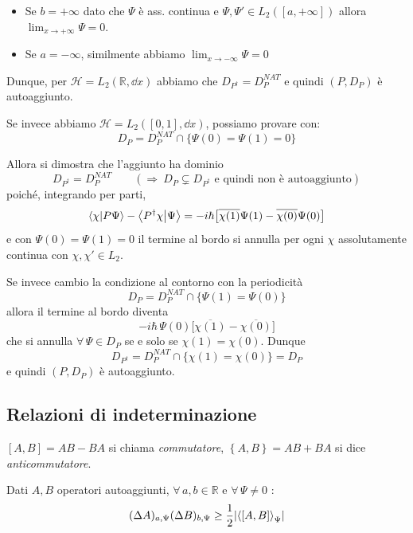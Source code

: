 \begin{itemize}
    \item Se \(b = +\infty\) dato che \(\Psi\) è ass. continua e \(\Psi, \Psi' \in L_2([a, +\infty])\) allora \(\lim_{x\to +\infty} \Psi= 0\).
    \item Se \(a = -\infty\), similmente abbiamo \(\lim_{x \to - \infty} \Psi=0\)
\end{itemize}
Dunque, per \(\mathcal{H}= L_2(\mathbb{R}, \dd{x})\) abbiamo che \(D_{P^\dagger}= D_{P}^{NAT}\) e quindi \((P, D_P)\) è autoaggiunto.

Se invece abbiamo \(\mathcal{H} = L_2([0,1], \dd{x})\), possiamo provare con:
\[
    D_P = D_P^{NAT} \cap \big\{ \Psi(0)=\Psi(1)=0 \big\}
\]

Allora si dimostra che l'aggiunto ha dominio
\[
    D_{P^\dagger}= D_P^{NAT} \qquad (\Rightarrow \ D_P \subsetneq D_{P^\dagger} \text{ e quindi non è autoaggiunto})
\]
poiché, integrando per parti,
\[
    \braket{\chi}{P\Psi}-\braket{P^\dagger\chi}{\Psi}
    = -i\hbar\big[\overline{\chi(1)}\Psi(1)-\overline{\chi(0)}\Psi(0)\big]
\]
e con \(\Psi(0)=\Psi(1)=0\) il termine al bordo si annulla per ogni \(\chi\) assolutamente continua con \(\chi,\chi'\in L_2\).

Se invece cambio la condizione al contorno con la periodicità
\[
    D_P = D_P^{NAT} \cap \big\{ \Psi(1)=\Psi(0) \big\}
\]
allora il termine al bordo diventa
\[
    -i\hbar\,\Psi(0)\big[\overline{\chi(1)}-\overline{\chi(0)}\big]
\]
che si annulla \(\forall\,\Psi\in D_P\) se e solo se \(\chi(1)=\chi(0)\). Dunque
\[
    D_{P^\dagger}= D_P^{NAT} \cap \big\{ \chi(1)=\chi(0) \big\}= D_P
\]
e quindi \((P,D_P)\) è autoaggiunto.



\subsection{Relazioni di indeterminazione}


\begin{definition}
    \([A,B]= AB-BA \) si chiama \textit{commutatore}, \(\left\{ A, B \right\} = AB+BA \) si dice \textit{anticommutatore}.
\end{definition}
\begin{theorem}
    Dati \(A, B\) operatori autoaggiunti, \(\forall \, a,b \in \mathbb{ R}\) e \(\forall\, \Psi\neq 0 \) :
    \begin{equation}
        (\Delta A )_{a,\Psi} (\Delta B )_{b, \Psi}\geq \frac{1}{2}\abs{\expval{[A,B]}_\Psi}
    \end{equation}
\end{theorem}

